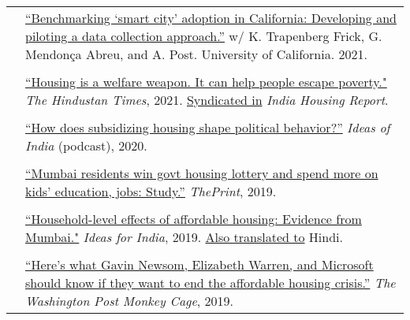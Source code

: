 \documentclass[letterpaper, 10.5pt]{article}
\begin{document}
\begin{longtable}{p{1.5in}p{5in}}
& \href{https://escholarship.org/uc/item/3797p0ws}{``Benchmarking `smart city' adoption in California: Developing and piloting a data collection approach.''} w/ K. Trapenberg Frick, G. Mendon\c{c}a Abreu, and A. Post. University of California. 2021. \\
& \\

& \href{https://www.hindustantimes.com/opinion/housing-is-a-welfare-weapon-it-can-help-people-escape-poverty-101629993983576.html}{``Housing is a welfare weapon. It can help people escape poverty."} \textit{The Hindustan Times}, 2021. \href{https://indiahousingreport.in/outputs/opinion/housing-is-a-welfare-weapon-it-can-help-people-escape-poverty/}{Syndicated in} \textit{India Housing Report}. \\ 
& \\
&   \href{https://www.discoursemagazine.com/politics/2020/12/24/ideas-of-india-how-does-subsidizing-housing-prices-shape-political-behavior}{``How does subsidizing housing shape political behavior?''} \textit{Ideas of India} (podcast), 2020.\\

& \\
& \href{https://theprint.in/opinion/mumbai-residents-win-govt-housing-lottery-and-spend-more-on-kids-education-jobs-study/290485/}{``Mumbai residents win govt housing lottery and spend more on kids' education, jobs: Study.''} \textit{ThePrint}, 2019. \\
& \\
&\href{https://www.ideasforindia.in/topics/poverty-inequality/household-level-effects-of-affordable-housing-evidence-from-mumbai.html}{``Household-level effects of affordable housing: Evidence from Mumbai."} \textit{Ideas for India}, 2019.  \href{https://www.ideasforindia.in/topics/poverty-inequality/household-level-effects-of-affordable-housing-evidence-from-mumbai-hindi.html}{Also translated to} Hindi.\\

& \\

& \href{https://www.washingtonpost.com/news/monkey-cage/wp/2019/01/31/heres-what-gavin-newsom-elizabeth-warren-and-microsoft-should-know-if-want-to-end-the-affordable-housing-crisis/?tid=sm_tw_cage}{``Here's what Gavin Newsom, Elizabeth Warren, and Microsoft should know if they want to end the affordable housing crisis.''} \textit{The Washington Post Monkey Cage}, 2019.\\




\end{longtable}
\end{document}
